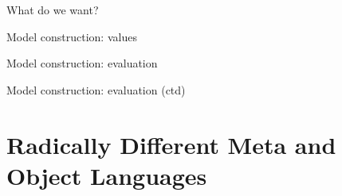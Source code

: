 \documentclass[aspectratio=169]{beamer}
\begin{document}
\begin{frame}{What do we want?}
\end{frame}

\begin{frame}{Model construction: values}

  \begin{AgdaSuppressSpace}
  \end{AgdaSuppressSpace}
\end{frame}

\begin{frame}{Model construction: evaluation}
  \begin{AgdaSuppressSpace}
  \end{AgdaSuppressSpace}

  \begin{AgdaSuppressSpace}
  \end{AgdaSuppressSpace}
\end{frame}

\begin{frame}{Model construction: evaluation (ctd)}

  \bigskip

\end{frame}


\section{Radically Different Meta and Object Languages}

\end{document}
